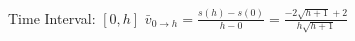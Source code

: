 {Time Interval: $[0,h]$}
{$\bar{v}_{0\to h} = \frac{s(h)-s(0)}{h-0}=\frac{-2\sqrt{h+1}+2}{h\sqrt{h+1}}$}